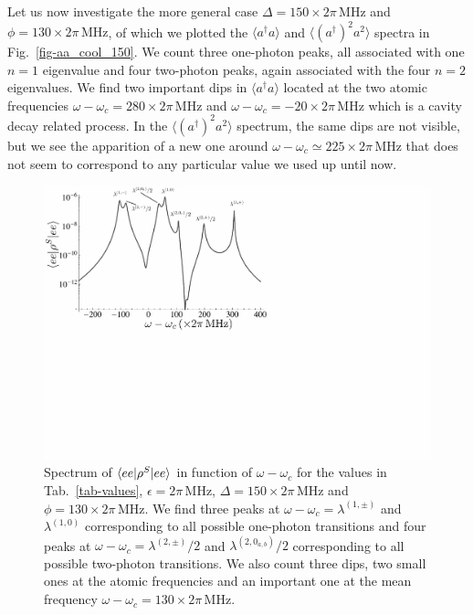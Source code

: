 Let us now investigate the more general case $\Delta=150 \times 2\pi\,\mbox{MHz}$ and $\phi = 130\times 2\pi\,\mbox{MHz}$, of which we plotted the $\langle a^\dagger a \rangle$ and $\langle (a^\dagger)^2 a^2 \rangle$ spectra in Fig.~\ref{fig-aa_cool_150}. We count three one-photon peaks, all associated with one $n=1$ eigenvalue and four two-photon peaks, again associated with the four $n=2$ eigenvalues. We find two important dips in $\langle a^\dagger a \rangle$ located at the two atomic frequencies $\omega-\omega_c=280 \times 2\pi\,\mbox{MHz}$ and $\omega-\omega_c=-20 \times 2\pi\,\mbox{MHz}$ which is a cavity decay related process. In the $\langle (a^\dagger)^2 a^2 \rangle$ spectrum, the same dips are not visible, but we see the apparition of a new one around $\omega-\omega_c \simeq 225 \times 2\pi\,\mbox{MHz}$ that does not seem to correspond to any particular value we used up until now. 

\begin{figure}
\center
\includegraphics[width=0.75 \textwidth]{Images/chap5/ee_cool.pdf}
\caption[$\prodsc{ee}{\rho^S}{ee}$ in function of $\omega-\omega_c$]{Spectrum of $\prodsc{ee}{\rho^S}{ee}$ in function of $\omega-\omega_c$ for the values in Tab.~\ref{tab-values}, $\epsilon= 2\pi\,\mbox{MHz}$, $\Delta=150 \times 2\pi\,\mbox{MHz}$ and $\phi=130\times 2\pi\,\mbox{MHz}$. We find three peaks at $\omega-\omega_c=\lambda^{(1,\pm)}$ and $\lambda^{(1,0)}$ corresponding to all possible one-photon transitions and four peaks at $\omega-\omega_c = \lambda^{(2,\pm)}/2$ and $\lambda^{(2,0_{a,b})}/2$ corresponding to all possible two-photon transitions. We also count three dips, two small ones at the atomic frequencies and an important one at the mean frequency $\omega-\omega_c = 130 \times 2\pi\,\mbox{MHz}$.}
\label{fig-ee_cool}
\end{figure}

